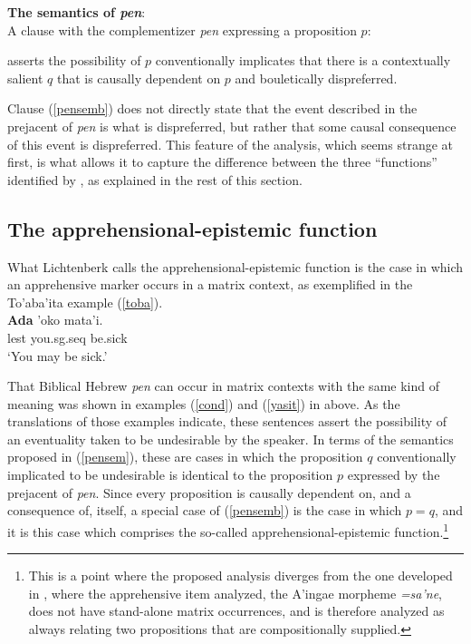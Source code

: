 \documentclass[output=paper,colorlinks,citecolor=brown]{langscibook}
\begin{document}
\ea
\label{pensem} \textnormal{\textbf{The semantics of \textit{pen}}:} \\
\textnormal{A clause with the complementizer \textit{pen} expressing a proposition $p$:}
\begin{xlist}\itemsep=-1mm
\ex\label{pensema} \textnormal{asserts the possibility of $p$}
\ex\label{pensemb} \textnormal{conventionally implicates that there is a contextually salient $q$ that is causally dependent on $p$ and bouletically dispreferred.}
\end{xlist}
\z

\noindent Clause (\ref{pensemb}) does not directly state that the event described in the prejacent of \textit{pen} is what is dispreferred, but rather that some causal consequence of this event is dispreferred. This feature of the analysis, which  seems strange at first, is  what allows it to capture the difference between the three ``functions'' identified by \citet{lichtenberk95}, as explained in the rest of this section. 

\subsection{The apprehensional-epistemic function}
\label{subsec:appr-epis}
What Lichtenberk calls the apprehensional-epistemic function is the case in which an apprehensive marker occurs in a matrix context, as exemplified in the To'aba'ita example (\ref{toba}). 
\ea
\label{toba}   \\
\gll \textbf{Ada} 'oko mata'i.\\
lest you.{\sc sg.seq} be.sick \phantom{rg}\\

\glt `You may be sick.'
\z

That Biblical Hebrew \textit{pen} can occur in matrix contexts with the same kind of meaning was shown in examples (\ref{cond}) and (\ref{yasit}) in  above. As the translations of those examples indicate, these sentences assert the possibility of an eventuality taken to be undesirable by the speaker. In terms of the semantics proposed in (\ref{pensem}), these are cases in which the proposition $q$ conventionally implicated to be undesirable is identical to the proposition $p$ expressed by the prejacent of \textit{pen}. 
Since every proposition is causally dependent on, and a consequence of, itself, a special case of (\ref{pensemb}) is the case in which $p=q$, and it is this case which comprises the so-called apprehensional-epistemic function.\footnote{This is a point where the proposed analysis diverges from the one developed in \cite{anderbois21}, where the apprehensive item analyzed, the A'ingae morpheme \textit{=sa'ne}, does not have stand-alone matrix occurrences, and is therefore analyzed as always relating two propositions that are compositionally supplied.}
\end{document}
